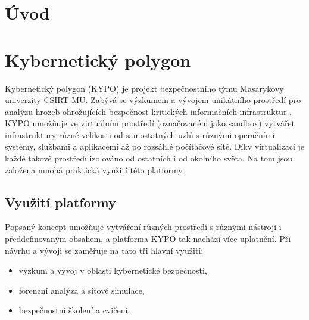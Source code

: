 \documentclass[
  digital, %
  oneside, %
  table,   %
  nolof,     %
  nolot,     %
]{fithesis3}
\begin{document}
\chapter{Úvod}

\chapter{Kybernetický polygon}
Kybernetický polygon (KYPO) je projekt bezpečnostního týmu Masarykovy univerzity CSIRT-MU. Zabývá se výzkumem a vývojem unikátního prostředí pro analýzu hrozeb ohrožujících bezpečnost kritických informačních infrastruktur \cite{kypocz}. KYPO umožňuje ve virtuálním prostředí (označovaném jako sandbox) vytvářet infrastruktury různé velikosti od samostatných uzlů s různými operačními systémy, službami a aplikacemi až po rozsáhlé počítačové sítě. Díky virtualizaci je každé takové prostředí izolováno od ostatních i od okolního světa. Na tom jsou založena mnohá praktická využití této platformy.

\section{Využití platformy}
Popsaný koncept umožňuje vytváření různých prostředí s různými nástroji i předdefinovaným obsahem, a platforma KYPO tak nachází více uplatnění. Při návrhu a vývoji se zaměřuje na tato tři hlavní využití:
\begin{itemize}
\item výzkum a vývoj v oblasti kybernetické bezpečnosti,
\item forenzní analýza a síťové simulace,
\item bezpečnostní školení a cvičení.
\end{itemize}
\end{document}
